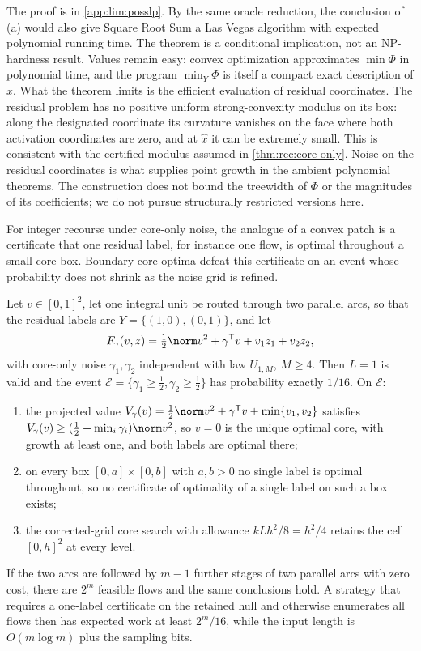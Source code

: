 The proof is in \cref{app:lim:posslp}. By the same oracle reduction, the
conclusion of (a) would also give Square Root Sum a Las Vegas algorithm with
expected polynomial running time. The theorem is a conditional implication,
not an NP-hardness result. Values remain easy: convex optimization
approximates $\min\Phi$ in polynomial time, and the program $\min_Y\Phi$ is
itself a compact exact description of $\hat x$. What the theorem limits is
the efficient evaluation of residual coordinates. The residual problem has
no positive uniform strong-convexity modulus on its box: along the designated
coordinate its curvature vanishes on the face where both activation
coordinates are zero, and at $\hat x$ it can be extremely small. This is
consistent with the certified modulus assumed in \cref{thm:rec:core-only}.
Noise on the residual coordinates is what supplies point growth in the
ambient polynomial theorems. The construction does not bound the treewidth
of $\Phi$ or the magnitudes of its coefficients; we do not pursue
structurally restricted versions here.

For integer recourse under core-only noise, the analogue of a convex patch
is a certificate that one residual label, for instance one flow, is optimal
throughout a small core box. Boundary core optima defeat this certificate on
an event whose probability does not shrink as the noise grid is refined.

\begin{proposition}\label{prop:lim:flow}
Let $v\in[0,1]^2$, let one integral unit be routed through two parallel
arcs, so that the residual labels are $Y=\{(1,0),(0,1)\}$, and let
\[
 F_\gamma(v,z)=\tfrac12\norm v^2+\gamma^{\mathsf T}v+v_1z_1+v_2z_2 ,
\]
with core-only noise $\gamma_1,\gamma_2$ independent with law $U_{1,M}$,
$M\ge4$. Then $L=1$ is valid and the event
$\mathcal E=\{\gamma_1\ge\frac12,\gamma_2\ge\frac12\}$ has probability
exactly $1/16$. On $\mathcal E$:
\begin{enumerate}[label=(\alph*)]
\item\label{it:lim:flow-growth} the projected value
$V_\gamma(v)=\frac12\norm v^2+\gamma^{\mathsf T}v+\min\{v_1,v_2\}$
satisfies $V_\gamma(v)\ge(\frac12+\min_i\gamma_i)\norm v^2$, so $v=0$ is
the unique optimal core, with growth at least one, and both labels are
optimal there;
\item\label{it:lim:flow-box} on every box $[0,a]\times[0,b]$ with $a,b>0$ no
single label is optimal throughout, so no certificate of optimality of a
single label on such a box exists;
\item\label{it:lim:flow-search} the corrected-grid core search with
allowance $kLh^2/8=h^2/4$ retains the cell $[0,h]^2$ at every level.
\end{enumerate}
If the two arcs are followed by $m-1$ further stages of two parallel arcs
with zero cost, there are $2^m$ feasible flows and the same conclusions hold.
A strategy that requires a one-label certificate on the retained hull and
otherwise enumerates all flows then has expected work at least $2^m/16$,
while the input length is $O(m\log m)$ plus the sampling bits.
\end{proposition}

